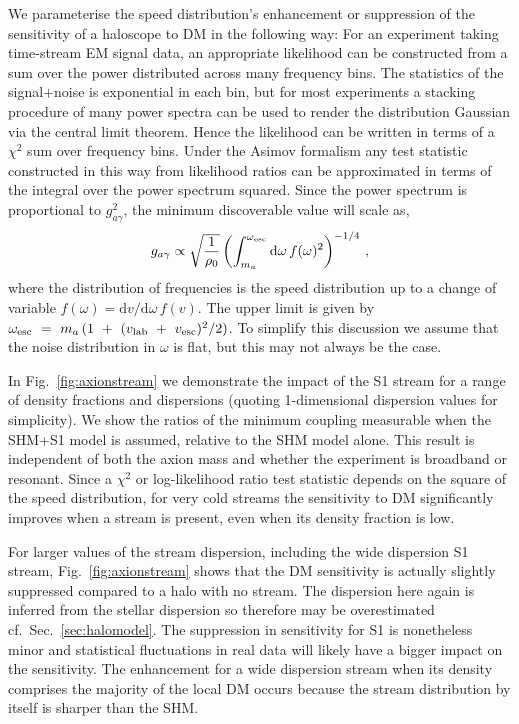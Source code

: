 \documentclass[prd,10pt,twocolumn,showpacs,nofootinbib,aps,superscriptaddress,preprintnumbers]{revtex4-1}
\newcommand{\vesc}{v_\mathrm{esc}}
\begin{document}
We parameterise the speed distribution's enhancement or suppression of the sensitivity of a haloscope to DM in the following way:
For an experiment taking time-stream EM signal data, an appropriate likelihood can be constructed from a sum over the power distributed across many frequency bins.
The statistics of the signal+noise is exponential in each bin, 
but for most experiments a stacking procedure of many power spectra can be used to render the distribution Gaussian via the central limit theorem.
Hence the likelihood can be written in terms of a $\chi^2$ sum over frequency bins.
Under the Asimov formalism any test statistic constructed in this way from likelihood ratios can
 be approximated in terms of the integral over the power spectrum squared. 
 Since the power spectrum is proportional to $g^2_{a\gamma}$, the minimum discoverable value will scale as,
 \begin{equation}
g_{a\gamma} \propto \sqrt{\frac{1}{\rho_0}} \left(\int_{m_a}^{\omega_{\rm esc}} \mathrm{d} \omega\, f(\omega)^2 \right)^{-1/4} \, ,
\end{equation}
where the distribution of frequencies is the speed distribution up to a change of variable $f(\omega) = \textrm{d}v/\textrm{d}\omega \, f(v)$. The upper limit is given by $\omega_{\rm esc}~=~m_a\,(1~+~(v_{\rm lab}~+~\vesc)^2/2)$. 
To simplify this discussion we assume that the noise distribution in $\omega$ is flat, but this may not always be the case.

In Fig.~\ref{fig:axionstream} we demonstrate the impact of the S1 stream for a range of density fractions and dispersions 
(quoting 1-dimensional dispersion values for simplicity). 
We show the ratios of the minimum coupling measurable when the SHM+S1 model is assumed, 
relative to the SHM model alone. This result is independent of both the axion mass and whether the experiment is broadband or resonant. 
Since a $\chi^2$ or log-likelihood ratio test statistic depends on the square of the speed distribution, 
for very cold streams the sensitivity to DM significantly improves when a stream is present, even when its density fraction is low. 

For larger values of the stream dispersion, including the wide dispersion S1 stream, Fig.~\ref{fig:axionstream} shows that the DM sensitivity is actually slightly suppressed compared to a halo with no stream. The dispersion here again is inferred from the stellar dispersion so therefore may be overestimated cf.~Sec.~\ref{sec:halomodel}. The suppression in sensitivity for S1 is nonetheless minor and statistical fluctuations in real data will likely have a bigger impact on the sensitivity. The enhancement for a wide dispersion stream when its density comprises the majority of the local DM occurs because the stream distribution by itself is sharper than the SHM.
\end{document}

